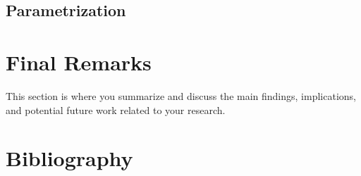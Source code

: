 \documentclass[
	12pt, 
	]{article}
\numberwithin{equation}{section}
\theoremstyle{definition}
\theoremstyle{plain}
\theoremstyle{plain}
\theoremstyle{plain}
\begin{document}
\newpage

\subsection{Parametrization}

\lipsum[1]


\section{Final Remarks}

This section is where you summarize and discuss the main findings, implications, and potential future work related to your research.

\lipsum[1]

\newpage


\section*{Bibliography}

{	
	\onehalfspacing
	\printbibliography[heading=bibintoc]
}

\newpage


\appendix


\end{document}
